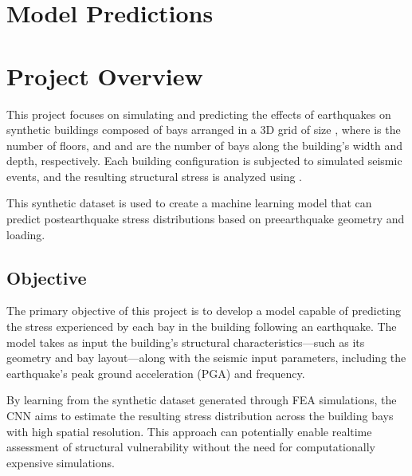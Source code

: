 \documentclass[letterpaper,10pt,english]{sphinxmanual}
\begin{document}
\sphinxstepscope


\chapter{Model Predictions}
\label{\detokenize{predictions:model-predictions}}\label{\detokenize{predictions::doc}}

\chapter{Project Overview}
\label{\detokenize{index:project-overview}}
\sphinxAtStartPar
This project focuses on simulating and predicting the effects of earthquakes
on synthetic buildings composed of bays arranged in a 3D grid of size
, where  is the number of floors, and  and  are the
number of bays along the building’s width and depth, respectively.
Each building configuration is subjected to simulated seismic events, and the
resulting structural stress is analyzed using .

\sphinxAtStartPar
This synthetic dataset is used to create a machine learning model that can
predict post\sphinxhyphen{}earthquake stress distributions based on pre\sphinxhyphen{}earthquake geometry
and loading.


\section{Objective}
\label{\detokenize{index:objective}}
\sphinxAtStartPar
The primary objective of this project is to develop a 
model capable of predicting the stress experienced by each bay in the building
following an earthquake.
The model takes as input the building’s structural characteristics—such as its
geometry and bay layout—along with the seismic input parameters, including the
earthquake’s peak ground acceleration (PGA) and frequency.

\sphinxAtStartPar
By learning from the synthetic dataset generated through FEA simulations, the
CNN aims to estimate the resulting stress distribution across the building bays
with high spatial resolution.
This approach can potentially enable real\sphinxhyphen{}time assessment of structural vulnerability
without the need for computationally expensive simulations.



\renewcommand{\indexname}{Index}
\printindex
\end{document}
